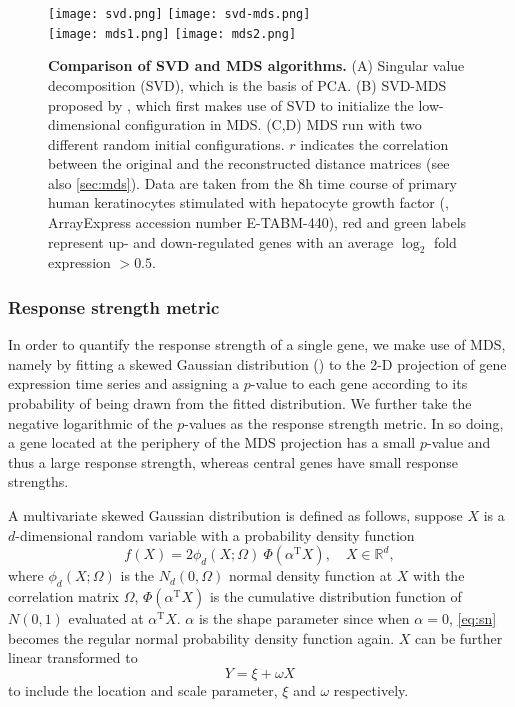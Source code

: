 \begin{figure}[!ht]
\centering
\texttt{[image: svd.png]}
\texttt{[image: svd-mds.png]}\\
\texttt{[image: mds1.png]}
\texttt{[image: mds2.png]}
\caption[Performance of the MDS algorithm]{
{\bf Comparison of SVD and MDS algorithms.}
(A) Singular 
value decomposition (SVD), which is the basis of PCA. (B) SVD-MDS
proposed by \citealp{Becavin2011}, which first makes use of
SVD to initialize the low-dimensional configuration in MDS.
(C,D) MDS run with two different random initial 
configurations. $r$ indicates the correlation between the
original and the reconstructed distance matrices (see also
\ref{sec:mds}). 
Data are taken from the 8h time course of primary human keratinocytes 
stimulated with hepatocyte growth factor (\cite{Busch2008}, 
ArrayExpress accession number E-TABM-440),
red and green labels represent up- and 
down-regulated genes with an average $\log_2$ fold expression 
$> 0.5$. }
\label{fig:svd-mds}
\end{figure}

\subsubsection{Response strength metric}
\label{sec:response_strength}
In order to quantify the response strength of a single gene, we make use of 
MDS, namely by fitting a skewed Gaussian distribution (\citealp{Azzalini2003}) 
to the 2-D projection
of gene expression time series and assigning a $p$-value to each
gene according to its probability of being drawn from the fitted distribution.
We further take the negative logarithmic of the $p$-values as the response
strength metric. In so doing, a gene located at the periphery of the MDS
projection has a small $p$-value and thus a large response strength, whereas
central genes have small response strengths.

A multivariate skewed Gaussian distribution is defined as follows, suppose
$X$ is a $d$-dimensional random variable with a probability density function
\begin{equation}
f(X) = 2 \phi_d (X;\Omega) \ \Phi(\alpha^{\mathrm{T}} X), \quad X \in \mathbb{R}^d,
\label{eq:sn}
\end{equation}
where $\phi_d(X;\Omega)$ is the $N_d(0,\Omega)$ normal density function at $X$
with the correlation matrix $\Omega$, $\Phi(\alpha^{\mathrm{T}} X)$ is the 
cumulative distribution function of $N(0,1)$ evaluated at $\alpha^{\mathrm{T}} X$.
$\alpha$ is the shape parameter since when $\alpha=0$, \ref{eq:sn} becomes
the regular normal probability density function again. $X$ can be further
linear transformed to
\[
Y = \xi + \omega X
\]
to include the location and scale parameter, $\xi$ and $\omega$ respectively.

